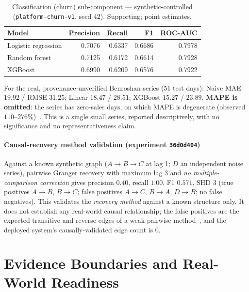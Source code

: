 \documentclass[conference]{IEEEtran}
\newcommand{\code}[1]{\texttt{#1}}
\newcommand{\expid}[1]{\texttt{#1}}
\begin{document}
\begin{table}[!t]
\caption{Classification (churn) sub-component --- synthetic-controlled
(\code{platform-churn-v1}, seed 42). Supporting; point estimates.}
\label{tab:churn}
\centering
\renewcommand{\arraystretch}{1.2}
\begin{tabular}{@{}lrrrr@{}}
\toprule
Model & Precision & Recall & F1 & ROC-AUC\\
\midrule
Logistic regression & 0.7076 & 0.6337 & 0.6686 & 0.7978\\
Random forest       & 0.7125 & 0.6172 & 0.6614 & 0.7928\\
XGBoost             & 0.6990 & 0.6209 & 0.6576 & 0.7922\\
\bottomrule
\end{tabular}
\end{table}

For the real, provenance-unverified Benroshan series (51 test days): Naive
MAE $19.92$ / RMSE $31.25$; Linear $18.47$ / $28.51$; XGBoost $15.27$ / $23.89$.
\textbf{MAPE is omitted}: the series has zero-sales days, on which MAPE is
degenerate (observed $110$--$276\%$)~\cite{Hyndman2006}. This is a single small
series, reported descriptively, with no significance and no representativeness
claim.

\paragraph{Causal-recovery method validation (experiment \expid{36d0d404})}
Against a known synthetic graph ($A\!\rightarrow\!B\!\rightarrow\!C$ at lag 1;
$D$ an independent noise series), pairwise Granger recovery with maximum lag 3
and \emph{no multiple-comparison correction} gives precision $0.40$, recall
$1.00$, F1 $0.571$, SHD $3$ (true positives $A\!\rightarrow\!B$,
$B\!\rightarrow\!C$; false positives $A\!\rightarrow\!C$, $B\!\rightarrow\!A$,
$D\!\rightarrow\!B$; no false negatives). This validates the \emph{recovery
method} against a known structure only. It does not establish any real-world
causal relationship; the false positives are the expected transitive and
reverse edges of a weak pairwise method~\cite{Spirtes2000,Benjamini1995,Granger1969},
and the deployed system's causally-validated edge count is 0.

\section{Evidence Boundaries and Real-World Readiness}
\label{sec:evidence}
\end{document}
